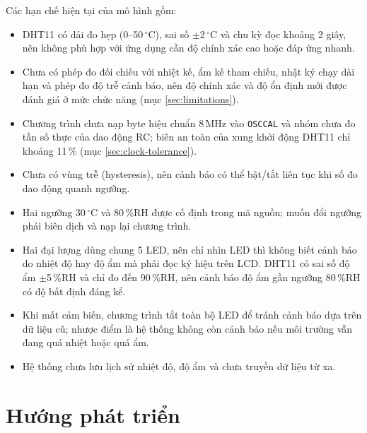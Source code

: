 Các hạn chế hiện tại của mô hình gồm:
\begin{itemize}[leftmargin=1.2cm]
    \item DHT11 có dải đo hẹp (0--50\,$^\circ$C), sai số $\pm$2\,$^\circ$C và chu kỳ đọc khoảng 2 giây, nên không phù hợp với ứng dụng cần độ chính xác cao hoặc đáp ứng nhanh.
    \item Chưa có phép đo đối chiếu với nhiệt kế, ẩm kế tham chiếu, nhật ký chạy dài hạn và phép đo độ trễ cảnh báo, nên độ chính xác và độ ổn định mới được đánh giá ở mức chức năng (mục \ref{sec:limitations}).
    \item Chương trình chưa nạp byte hiệu chuẩn 8\,MHz vào \texttt{OSCCAL} và nhóm chưa đo tần số thực của dao động RC; biên an toàn của xung khởi động DHT11 chỉ khoảng 11\,\% (mục \ref{sec:clock-tolerance}).
    \item Chưa có vùng trễ (hysteresis), nên cảnh báo có thể bật/tắt liên tục khi số đo dao động quanh ngưỡng.
    \item Hai ngưỡng 30\,$^\circ$C và 80\,\%RH được cố định trong mã nguồn; muốn đổi ngưỡng phải biên dịch và nạp lại chương trình.
    \item Hai đại lượng dùng chung 5 LED, nên chỉ nhìn LED thì không biết cảnh báo do nhiệt độ hay độ ẩm mà phải đọc ký hiệu trên LCD. DHT11 có sai số độ ẩm $\pm$5\,\%RH và chỉ đo đến 90\,\%RH, nên cảnh báo độ ẩm gần ngưỡng 80\,\%RH có độ bất định đáng kể.
    \item Khi mất cảm biến, chương trình tắt toàn bộ LED để tránh cảnh báo dựa trên dữ liệu cũ; nhược điểm là hệ thống không còn cảnh báo nếu môi trường vẫn đang quá nhiệt hoặc quá ẩm.
    \item Hệ thống chưa lưu lịch sử nhiệt độ, độ ẩm và chưa truyền dữ liệu từ xa.
\end{itemize}

\section{Hướng phát triển}
\label{sec:future}

